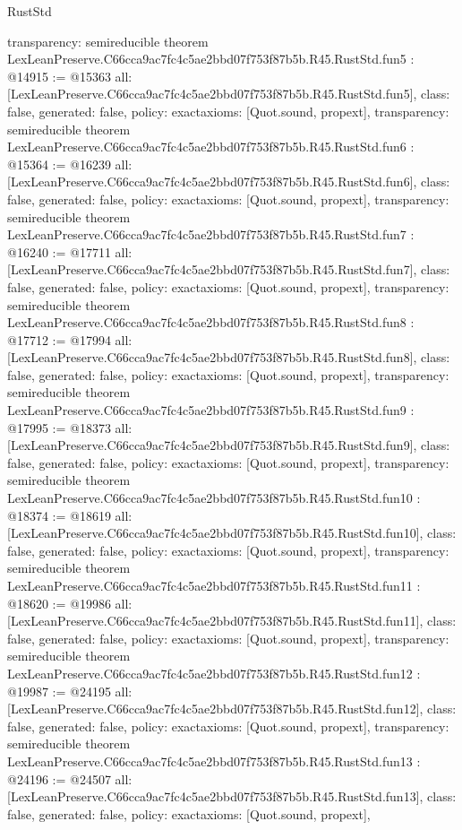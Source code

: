 \begin{lexlean}{RustStd}
\begin{coremodule}
{  transparency: semireducible
}
theorem LexLeanPreserve.C66cca9ac7fc4c5ae2bbd07f753f87b5b.R45.RustStd.fun5 : @14915 := @15363 {
  all: [LexLeanPreserve.C66cca9ac7fc4c5ae2bbd07f753f87b5b.R45.RustStd.fun5],
  class: false,
  generated: false,
  policy: exact{axioms: [Quot.sound, propext]},
  transparency: semireducible
}
theorem LexLeanPreserve.C66cca9ac7fc4c5ae2bbd07f753f87b5b.R45.RustStd.fun6 : @15364 := @16239 {
  all: [LexLeanPreserve.C66cca9ac7fc4c5ae2bbd07f753f87b5b.R45.RustStd.fun6],
  class: false,
  generated: false,
  policy: exact{axioms: [Quot.sound, propext]},
  transparency: semireducible
}
theorem LexLeanPreserve.C66cca9ac7fc4c5ae2bbd07f753f87b5b.R45.RustStd.fun7 : @16240 := @17711 {
  all: [LexLeanPreserve.C66cca9ac7fc4c5ae2bbd07f753f87b5b.R45.RustStd.fun7],
  class: false,
  generated: false,
  policy: exact{axioms: [Quot.sound, propext]},
  transparency: semireducible
}
theorem LexLeanPreserve.C66cca9ac7fc4c5ae2bbd07f753f87b5b.R45.RustStd.fun8 : @17712 := @17994 {
  all: [LexLeanPreserve.C66cca9ac7fc4c5ae2bbd07f753f87b5b.R45.RustStd.fun8],
  class: false,
  generated: false,
  policy: exact{axioms: [Quot.sound, propext]},
  transparency: semireducible
}
theorem LexLeanPreserve.C66cca9ac7fc4c5ae2bbd07f753f87b5b.R45.RustStd.fun9 : @17995 := @18373 {
  all: [LexLeanPreserve.C66cca9ac7fc4c5ae2bbd07f753f87b5b.R45.RustStd.fun9],
  class: false,
  generated: false,
  policy: exact{axioms: [Quot.sound, propext]},
  transparency: semireducible
}
theorem LexLeanPreserve.C66cca9ac7fc4c5ae2bbd07f753f87b5b.R45.RustStd.fun10 : @18374 := @18619 {
  all: [LexLeanPreserve.C66cca9ac7fc4c5ae2bbd07f753f87b5b.R45.RustStd.fun10],
  class: false,
  generated: false,
  policy: exact{axioms: [Quot.sound, propext]},
  transparency: semireducible
}
theorem LexLeanPreserve.C66cca9ac7fc4c5ae2bbd07f753f87b5b.R45.RustStd.fun11 : @18620 := @19986 {
  all: [LexLeanPreserve.C66cca9ac7fc4c5ae2bbd07f753f87b5b.R45.RustStd.fun11],
  class: false,
  generated: false,
  policy: exact{axioms: [Quot.sound, propext]},
  transparency: semireducible
}
theorem LexLeanPreserve.C66cca9ac7fc4c5ae2bbd07f753f87b5b.R45.RustStd.fun12 : @19987 := @24195 {
  all: [LexLeanPreserve.C66cca9ac7fc4c5ae2bbd07f753f87b5b.R45.RustStd.fun12],
  class: false,
  generated: false,
  policy: exact{axioms: [Quot.sound, propext]},
  transparency: semireducible
}
theorem LexLeanPreserve.C66cca9ac7fc4c5ae2bbd07f753f87b5b.R45.RustStd.fun13 : @24196 := @24507 {
  all: [LexLeanPreserve.C66cca9ac7fc4c5ae2bbd07f753f87b5b.R45.RustStd.fun13],
  class: false,
  generated: false,
  policy: exact{axioms: [Quot.sound, propext]},
}
\end{coremodule}
\end{lexlean}
